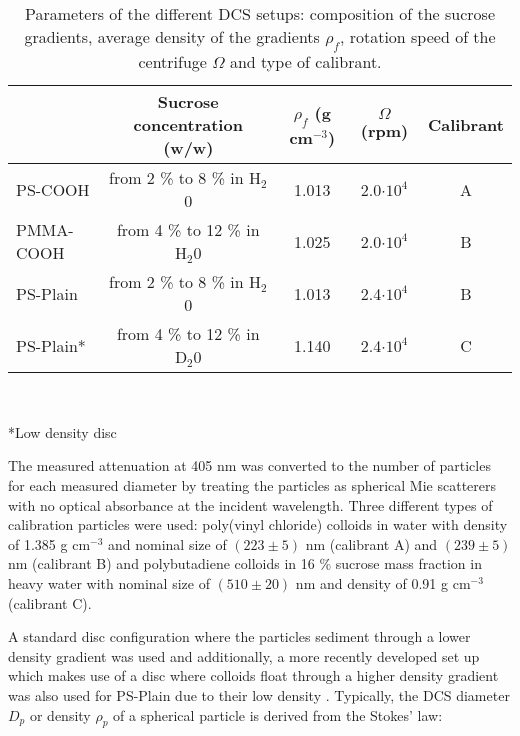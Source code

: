 \begin{table*}[]
\centering
\caption[Parameters of the different DCS setups.]{Parameters of the different DCS setups: composition of the sucrose gradients, average density of the gradients $\rho_f$, rotation speed of the centrifuge $\Omega$ and type of calibrant.}
\label{tab:DCSParameters}
\begin{tabular}{l|c|c|c|c|}
\cline{2-5}
\multicolumn{1}{c|}{}                         & Sucrose concentration (w/w)    & $\rho_f$ (g cm$^{-3}$) & $\Omega$ (rpm)  & Calibrant \\ \hline
\multicolumn{1}{|l|}{PS-COOH}    & from 2 \% to 8 \% in H$_2$0  & 1.013                  & 2.0$\cdot 10^4$                  & A         \\ \hline
\multicolumn{1}{|l|}{PMMA-COOH}  & from 4 \% to 12 \% in H$_2$0 & 1.025                  & 2.0$\cdot 10^4$                  & B         \\ \hline
\multicolumn{1}{|l|}{PS-Plain}      & from 2 \% to 8 \% in H$_2$0  & 1.013     & 2.4$\cdot 10^4$                  & B        \\ \hline
\multicolumn{1}{|l|}{PS-Plain*} & from 4 \% to 12 \% in D$_2$0 & 1.140     & 2.4$\cdot 10^4$                  & C         \\ \hline

\end{tabular}\\[0.3\baselineskip]
\begin{minipage}{15cm}
	\begin{raggedright}
	*\small{Low density disc}
	\end{raggedright}
\end{minipage}
\label{tab:composition}
\end{table*}

The measured attenuation at 405 nm was converted to the number of particles for each measured diameter by treating the particles as spherical Mie scatterers with no optical absorbance at the incident wavelength. Three different types of calibration particles were used: poly(vinyl chloride) colloids in water with density of 1.385 g cm$^{-3}$ and nominal size of $(223\pm5)$ nm (calibrant A) and $(239\pm5)$ nm (calibrant B) and polybutadiene colloids in 16 \% sucrose mass fraction in heavy water with nominal size of $(510\pm20)$ nm and density of 0.91 g cm$^{-3}$ (calibrant C). 

A standard disc configuration where the particles sediment through a lower density gradient was used and additionally, a more recently developed set up which makes use of a disc where colloids float through a higher density gradient was also used for PS-Plain due to their low density \citep{fitzpatrick_structure_1998}. Typically, the DCS diameter $D_p$ or density $\rho_p$ of a spherical particle is derived from the Stokes' law:

